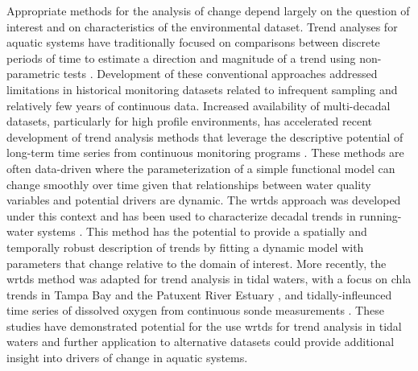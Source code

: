 \documentclass[journal = esthag, manuscript = article]{achemso}\usepackage[]{graphicx}\usepackage[]{color}
\begin{document}
Appropriate methods for the analysis of change depend largely on the question of interest and on characteristics of the environmental dataset.  Trend analyses for aquatic systems have traditionally focused on comparisons between discrete periods of time to estimate a direction and magnitude of a trend using non-parametric tests \cite{Hirsch91,Esterby96}. Development of these conventional approaches addressed limitations in historical monitoring datasets related to infrequent sampling and relatively few years of continuous data. Increased availability of multi-decadal datasets, particularly for high profile environments, has accelerated recent development of trend analysis methods that leverage the descriptive potential of long-term time series from continuous monitoring programs \cite{Bowes09,Halliday12}. These methods are often data-driven where the parameterization of a simple functional model can change smoothly over time given that relationships between water quality variables and potential drivers are dynamic.  The \ac{wrtds} approach was developed under this context and has been used to characterize decadal trends in running-water systems \cite{Hirsch10,Sprague11,Medalie12,Hirsch14,Zhang16}. This method has the potential to provide a spatially and temporally robust description of trends by fitting a dynamic model with parameters that change relative to the domain of interest.  More recently, the \ac{wrtds} method was adapted for trend analysis in tidal waters, with a focus on \ac{chla} trends in Tampa Bay \cite{Beck15} and the Patuxent River Estuary \cite{BeckIP}, and tidally-infleunced time series of dissolved oxygen from continuous sonde measurements \cite{Beck15b}. These studies have demonstrated potential for the use \ac{wrtds} for trend analysis in tidal waters and further application to alternative datasets could provide additional insight into drivers of change in aquatic systems. 
\end{document}
